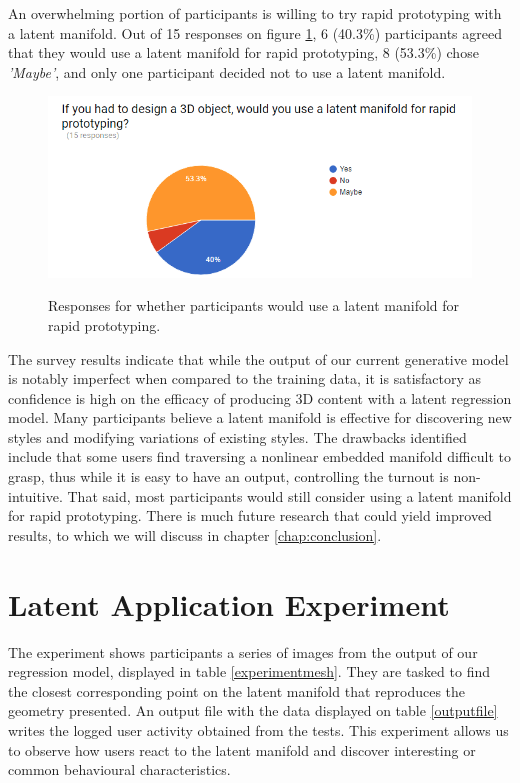 \documentclass[ %
author={Dillon Keith Diep},
supervisor={Dr. Carl Henrik Ek},
degree={MEng},
title={ART-CG Hair:},
subtitle={Assisted Real-time Content Generation of Stylised Virtual Hair},
type={Research},
year={2017} ]{dissertation}
\begin{document}
	An overwhelming portion of participants is willing to try rapid prototyping with a latent manifold. Out of 15 responses on figure \ref{surveyPrototype}, 6 (40.3\%) participants agreed that they would use a latent manifold for rapid prototyping, 8 (53.3\%) chose \textit{'Maybe'}, and only one participant decided not to use a latent manifold. 
	
	\begin{figure}[!h]
		\centering
		\caption{Responses for whether participants would use a latent manifold for rapid prototyping.}
		\includegraphics[scale=0.7]{images/surveyPrototype}
		\label{surveyPrototype}
	\end{figure}
	
	The survey results indicate that while the output of our current generative model is notably imperfect when compared to the training data, it is satisfactory as confidence is high on the efficacy of producing 3D content with a latent regression model. Many participants believe a latent manifold is effective for discovering new styles and modifying variations of existing styles. The drawbacks identified include that some users find traversing a nonlinear embedded manifold difficult to grasp, thus while it is easy to have an output, controlling the turnout is non-intuitive. That said, most participants would still consider using a latent manifold for rapid prototyping. There is much future research that could yield improved results, to which we will discuss in chapter \ref{chap:conclusion}.
	
	\section{Latent Application Experiment}
	\label{evaluation:experiment}
	The experiment shows participants a series of images from the output of our regression model, displayed in table \ref{experimentmesh}. They are tasked to find the closest corresponding point on the latent manifold that reproduces the geometry presented. An output file with the data displayed on table \ref{outputfile} writes the logged user activity obtained from the tests. This experiment allows us to observe how users react to the latent manifold and discover interesting or common behavioural characteristics.
	
\end{document}
